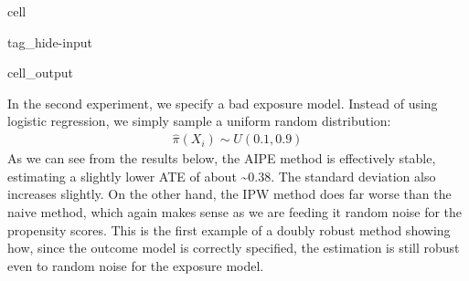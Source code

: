 \documentclass[letterpaper,10pt,english]{jupyterBook}
\begin{document}
\begin{sphinxuseclass}{cell}
\begin{sphinxuseclass}{tag_hide-input}\begin{sphinxVerbatimOutput}

\begin{sphinxuseclass}{cell_output}
\noindent{}

\end{sphinxuseclass}\end{sphinxVerbatimOutput}

\end{sphinxuseclass}
\end{sphinxuseclass}
\sphinxAtStartPar
In the second experiment, we specify a bad exposure model. Instead of using logistic regression, we simply sample a uniform random distribution:
\begin{equation*}
\begin{split} \hat \pi (X_i) \sim U(0.1,0.9) \end{split}
\end{equation*}
\sphinxAtStartPar
As we can see from the results below, the AIPE method is effectively stable, estimating a slightly lower ATE of about \textasciitilde{}\(0.38\). The standard deviation also increases slightly. On the other hand, the IPW method does far worse than the naive method, which again makes sense as we are feeding it random noise for the propensity scores. This is the first example of a doubly robust method showing how, since the outcome model is correctly specified, the estimation is still robust even to random noise for the exposure model.
\end{document}
